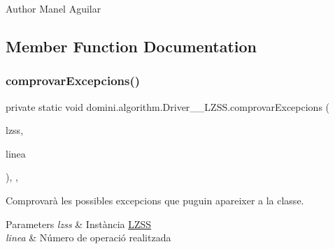 \begin{DoxyAuthor}{Author}
Manel Aguilar 
\end{DoxyAuthor}


\subsection{Member Function Documentation}
\mbox{\label{classdomini_1_1algorithm_1_1Driver____LZSS_a3b1983c6a71cd4d510e8434cd2e7f8f2}} 
\subsubsection{\texorpdfstring{comprovar\+Excepcions()}{comprovarExcepcions()}}
{\footnotesize\ttfamily private static void domini.\+algorithm.\+Driver\+\_\+\+\_\+\+L\+Z\+S\+S.\+comprovar\+Excepcions (\begin{DoxyParamCaption}\item[{\hyperlink{classdomini_1_1algorithm_1_1LZSS}{L\+Z\+SS}}]{lzss,  }\item[{String}]{linea }\end{DoxyParamCaption})\hspace{0.3cm}{\ttfamily [inline]}, {\ttfamily [static]}, {\ttfamily [private]}}



Comprovarà les possibles excepcions que puguin apareixer a la classe. 


\begin{DoxyParams}{Parameters}
{\em lzss} & Instància \hyperlink{classdomini_1_1algorithm_1_1LZSS}{L\+Z\+SS} \\
\hline
{\em linea} & Número de operació realitzada \\
\hline
\end{DoxyParams}
\mbox{\label{classdomini_1_1algorithm_1_1Driver____LZSS_ac1b8e15e184e7372a5ad2a76ac3b5d8c}} 
